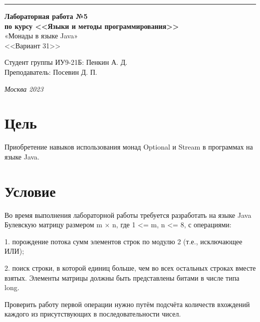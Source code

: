 ﻿\documentclass[a4paper, 12pt]{extarticle}
\begin{document}
\begin{titlepage}
\vspace*{-16pt}
\hspace{30pt}\rule{0.866\textwidth}{0.4pt}
  
\vspace{6em}

\begin{center}
\Large {\bf Лабораторная работа №5} \\ 
\large {\bf по курсу <<Языки и методы программирования>>} \\ 
\large «Монады в языке Java» \\
\large <<Вариант 31>>
\end{center}\normalsize

\vspace{15em}


\begin{flushright}
  {Студент группы ИУ9-21Б: Пенкин А. Д.\hspace*{15pt} \\
  \vspace{2ex}
  Преподаватель: Посевин Д. П.\hspace*{15pt}}
\end{flushright}

\bigskip

\vfill
 \vspace{7em}

\begin{center}
\textsl{Москва 2023}
\end{center}
\end{titlepage}

\renewcommand{\ttdefault}{pcr}

\setlength{\tabcolsep}{3pt}
\newpage
\setcounter{page}{2}

\section{Цель}\label{Sect::task}
\par
Приобретение навыков использования монад Optional и Stream в программах на языке Java. 
\section{Условие}
\par
Во время выполнения лабораторной работы требуется разработать на языке Java Булевскую матрицу размером m × n, где 1 <= m, n <=
8, с операциями:
\par
1. порождение потока сумм элементов строк по модулю 2 (т.е., исключающее ИЛИ);
\par
2. поиск строки, в которой единиц больше, чем во всех остальных строках вместе взятых. Элементы матрицы должны быть представлены битами в числе типа long. 
\par
Проверить работу первой операции нужно путём подсчёта количеств вхождений каждого из присутствующих в последовательности чисел.
\end{document}
